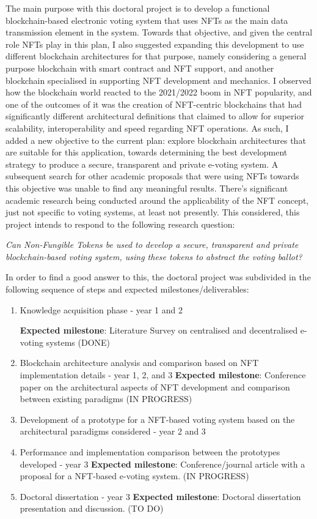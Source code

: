 \documentclass[../main.tex]{subfiles}
\begin{document}
\par
The main purpose with this doctoral project is to develop a functional blockchain-based electronic voting system that uses NFTs as the main data transmission element in the system. Towards that objective, and given the central role NFTs play in this plan, I also suggested expanding this development to use different blockchain architectures for that purpose, namely considering a general purpose blockchain with smart contract and NFT support, and another blockchain specialised in supporting NFT development and mechanics. I observed how the blockchain world reacted to the 2021/2022 boom in NFT popularity, and one of the outcomes of it was the creation of NFT-centric blockchains that had significantly different architectural definitions that claimed to allow for superior scalability, interoperability and speed regarding NFT operations. As such, I added a new objective to the current plan: explore blockchain architectures that are suitable for this application, towards determining the best development strategy to produce a secure, transparent and private e-voting system. A subsequent search for other academic proposals that were using NFTs towards this objective was unable to find any meaningful results. There's significant academic research being conducted around the applicability of the NFT concept, just not specific to voting systems, at least not presently. This considered, this project intends to respond to the following research question:
\par
\textit{Can Non-Fungible Tokens be used to develop a secure, transparent and private blockchain-based voting system, using these tokens to abstract the voting ballot?}
\par
In order to find a good answer to this, the doctoral project was subdivided in the following sequence of steps and expected milestones/deliverables:
\begin{enumerate}
    \item {Knowledge acquisition phase - year 1 and 2}
          \par
          \textbf{Expected milestone}: Literature Survey on centralised and decentralised e-voting systems (DONE)
    \item {Blockchain architecture analysis and comparison based on NFT implementation details - year 1, 2, and 3}
          \textbf{Expected milestone}: Conference paper on the architectural aspects of NFT development and comparison between existing paradigms (IN PROGRESS)
    \item {Development of a prototype for a NFT-based voting system based on the architectural paradigms considered - year 2 and 3}
    \item {Performance and implementation comparison between the prototypes developed - year 3}
          \textbf{Expected milestone}: Conference/journal article with a proposal for a NFT-based e-voting system. (IN PROGRESS)
    \item {Doctoral dissertation - year 3}
          \textbf{Expected milestone}: Doctoral dissertation presentation and discussion. (TO DO)
\end{enumerate}
\end{document}
